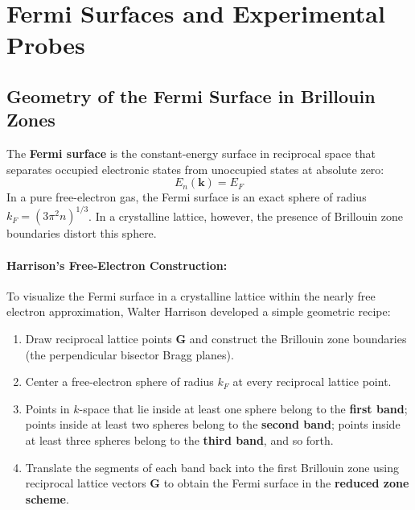 \documentclass[11pt,a4paper]{article}
\newcommand{\vb}[1]{\mathbf{#1}}
\begin{document}
\clearpage


\section{Fermi Surfaces and Experimental Probes}
\label{sec:fermi_surfaces}

\subsection{Geometry of the Fermi Surface in Brillouin Zones}
The \textbf{Fermi surface} is the constant-energy surface in reciprocal space that separates occupied electronic states from unoccupied states at absolute zero:
\begin{equation}
E_n(\vb{k}) = E_F
\end{equation}
In a pure free-electron gas, the Fermi surface is an exact sphere of radius $k_F = (3\pi^2 n)^{1/3}$. In a crystalline lattice, however, the presence of Brillouin zone boundaries distort this sphere.

\paragraph{Harrison's Free-Electron Construction:}
To visualize the Fermi surface in a crystalline lattice within the nearly free electron approximation, Walter Harrison developed a simple geometric recipe:
\begin{enumerate}
    \item Draw reciprocal lattice points $\vb{G}$ and construct the Brillouin zone boundaries (the perpendicular bisector Bragg planes).
    \item Center a free-electron sphere of radius $k_F$ at every reciprocal lattice point.
    \item Points in $k$-space that lie inside at least one sphere belong to the \textbf{first band}; points inside at least two spheres belong to the \textbf{second band}; points inside at least three spheres belong to the \textbf{third band}, and so forth.
    \item Translate the segments of each band back into the first Brillouin zone using reciprocal lattice vectors $\vb{G}$ to obtain the Fermi surface in the \textbf{reduced zone scheme}.
\end{enumerate}
\end{document}

